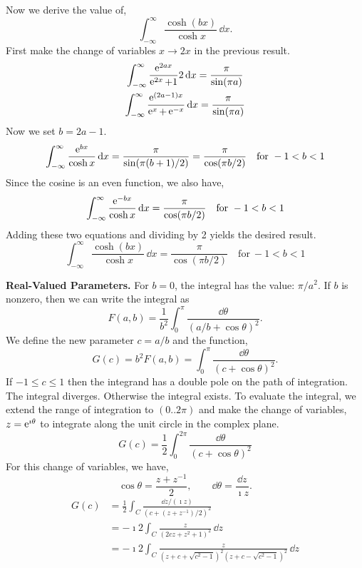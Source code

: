 {\begin{Solution}
  Now we derive the value of,
  \[
  \int_{-\infty}^\infty \frac{\cosh(b x)}{\cosh x} \,\dd x.
  \]
  First make the change of variables $x \to 2 x$ in the previous result.
  \begin{gather*}
    \int_{-\infty}^\infty \frac{\mathop{\mathrm{e}}\nolimits^{2 a x}}{\mathop{\mathrm{e}}\nolimits^{2 x} + 1} 2 \,\mathrm{d} x = \frac{\pi}{\sin(\pi a)} \\
    \int_{-\infty}^\infty \frac{\mathop{\mathrm{e}}\nolimits^{(2 a - 1) x}}{\mathop{\mathrm{e}}\nolimits^x + \mathop{\mathrm{e}}\nolimits^{-x}}\,\mathrm{d} x = \frac{\pi}{\sin(\pi a)}
  \end{gather*}
  Now we set $b = 2 a - 1$.
  \[
  \int_{-\infty}^\infty \frac{\mathop{\mathrm{e}}\nolimits^{b x}}{\cosh x}\,\mathrm{d} x = \frac{\pi}{\sin(\pi (b+1)/2)}
  = \frac{\pi}{\cos(\pi b/2)} \quad \mathrm{for}\ -1 < b < 1
  \]
  Since the cosine is an even function, we also have,
  \[
  \int_{-\infty}^\infty \frac{\mathop{\mathrm{e}}\nolimits^{-b x}}{\cosh x}\,\mathrm{d} x 
  = \frac{\pi}{\cos(\pi b/2)} \quad \mathrm{for}\ -1 < b < 1
  \]
  Adding these two equations and dividing by 2 yields the desired result.
  \[
  \boxed{
    \int_{-\infty}^\infty \frac{\cosh(b x)}{\cosh x} \,\dd x
    = \frac{\pi}{\cos(\pi b/2)} \quad \mathrm{for}\ -1 < b < 1
    }
  \]
\end{Solution}










\begin{Solution}
  \label{solution 1/(a + b cos theta)^2}
  \textbf{Real-Valued Parameters.}
  For $b = 0$, the integral has the value: $\pi / a^2$.  If $b$ is nonzero,
  then we can write the integral as
  \[
  F(a,b) = \frac{1}{b^2} \int_0^\pi \frac{ \dd \theta }{ (a/b + \cos \theta)^2 }.
  \]
  We define the new parameter $c = a/b$ and the function,
  \[
  G(c) = b^2 F(a,b)
  = \int_0^\pi \frac{ \dd \theta }{ (c + \cos \theta)^2 }.
  \]
  If $-1 \leq c \leq 1$ then the integrand has a double pole on the path 
  of integration.  The integral diverges.  Otherwise the integral exists.
  To evaluate the integral, we extend the range of integration to $(0..2 \pi)$
  and make the change of variables, $z = \mathop{\mathrm{e}}\nolimits^{\imath \theta}$ to integrate along 
  the unit circle in the complex plane. 
  \[
  G(c) = \frac{1}{2} \int_0^{2 \pi} \frac{ \dd \theta }{ (c + \cos \theta)^2 }
  \]
  For this change of variables, we have,
  \[
  \cos \theta = \frac{z + z^{-1}}{2}, \qquad \dd \theta = \frac{\dd z}{\imath z}.
  \]
  \begin{align*}
    G(c)    &=  \frac{1}{2} \int_C \frac{ \dd z / (\imath z) }
    { (c + (z + z^{-1}) / 2)^2 } \\
    &=  - \imath 2 \int_C \frac{ z }
    { (2 c z + z^2 + 1)^2 } \,\dd z \\
    &=  - \imath 2 \int_C \frac{ z }
    { (z + c + \sqrt{c^2 - 1})^2 (z + c - \sqrt{c^2 - 1})^2 } 
    \,\dd z 
  \end{align*}


\end{Solution}}
